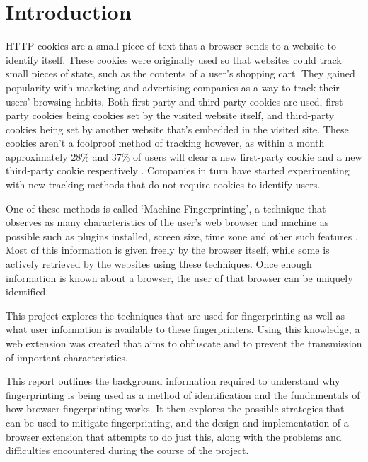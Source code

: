 \chapter{Introduction}

HTTP cookies are a small piece of text that a browser sends to a website to identify itself. These cookies were originally used so that websites could track small pieces of state, such as the contents of a user's shopping cart.
They gained popularity with marketing and advertising companies as a way to track their users' browsing habits.
Both first-party and third-party cookies are used, first-party cookies being cookies set by the visited website itself, and third-party cookies being set by another website that's embedded in the visited site.
These cookies aren't a foolproof method of tracking however, as within a month approximately 28\% and 37\% of users will clear a new first-party cookie and a new third-party cookie respectively \citep{comScore-cookies}.
Companies in turn have started experimenting with new tracking methods that do not require cookies to identify users.

One of these methods is called `Machine Fingerprinting', a technique that observes as many characteristics of the user's web browser and machine as possible such as plugins installed, screen size, time zone and other such features \citep{audio-fingerprint}.
Most of this information is given freely by the browser itself, while some is actively retrieved by the websites using these techniques.
Once enough information is known about a browser, the user of that browser can be uniquely identified.

This project explores the techniques that are used for fingerprinting as well as what user information is available to these fingerprinters. Using this knowledge, a web extension was created that aims to obfuscate and to prevent the transmission of important characteristics.

This report outlines the background information required to understand why fingerprinting is being used as a method of identification and the fundamentals of how browser fingerprinting works.
It then explores the possible strategies that can be used to mitigate fingerprinting, and the design and implementation of a browser extension that attempts to do just this, along with the problems and difficulties encountered during the course of the project.

